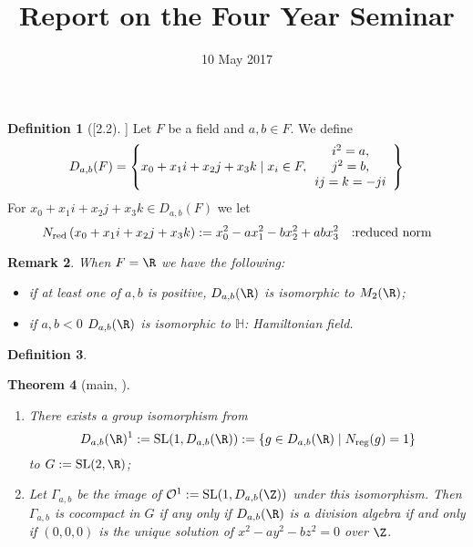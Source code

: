 \documentclass[a4paper,12pt]{article}
\title{Report on the Four Year Seminar}
\date{10 May 2017}
\newtheorem{theorem}{Theorem}
\newtheorem{remark}[theorem]{Remark}
\theoremstyle{definition}
\newtheorem{definition}[theorem]{Definition}
\begin{document}
\maketitle
\begin{definition}[\cite{bergeron2016spectrum}[2.2]]
	Let $F$ be a field and $a,b\in F$. We define\begin{equation*}
		D_{a,b}(F)=\left\{ x_0+x_1i+x_2j+x_3k\mid x_i\in F,\begin{array}[]{c}
		i^2=a,\\ j^2=b,\\ ij=k=-ji
	\end{array}\right\}
	\end{equation*}
	For $x_0+x_1i+x_2j+x_3k\in D_{a,b}(F)$ we let\begin{equation*}
		N_{\mbox{\scriptsize red}}\left(  x_0+x_1i+x_2j+x_3k\right):=x_0^2-ax_1^2-bx_2^2+abx_3^2\quad\mbox{:reduced norm}
	\end{equation*}
\end{definition}
\begin{remark}
	When $F=\R$ we have the following:\begin{itemize}
		\item if at least one of $a,b$ is positive, $D_{a,b}(\R)$ is isomorphic to $M_2(\R)$;
		\item if $a,b<0$ $D_{a,b}(\R)$ is isomorphic to $\mathbb{H}$: Hamiltonian field.
	\end{itemize}
\end{remark}
\begin{definition}

\end{definition}
\begin{theorem}[main, {\cite[Thm. 2.3, 3.]{bergeron2016spectrum}}]
	\begin{enumerate}
		\item There exists a group isomorphism from\begin{equation*}
				D_{a,b}(\R)^1:=\mbox{SL}(1,D_{a,b}(\R)):=\left\{ g\in D_{a,b}(\R)\mid N_{\mbox{\scriptsize reg}}(g)=1 \right\}
			\end{equation*}
			to $G:=\mbox{SL}(2,\R)$;
		\item Let $\Gamma_{a,b}$ be the image of $\mathcal{O}^1:=\mbox{SL}(1,D_{a,b}(\Z))$ under this isomorphism. Then $\Gamma_{a,b}$ is cocompact in $G$
			if any only if $D_{a,b}(\R)$ is a division algebra if and only if $(0,0,0)$ is the unique solution of $x^2-ay^2-bz^2=0$ over $\Z$.
	\end{enumerate}
\end{theorem}


\end{document}
